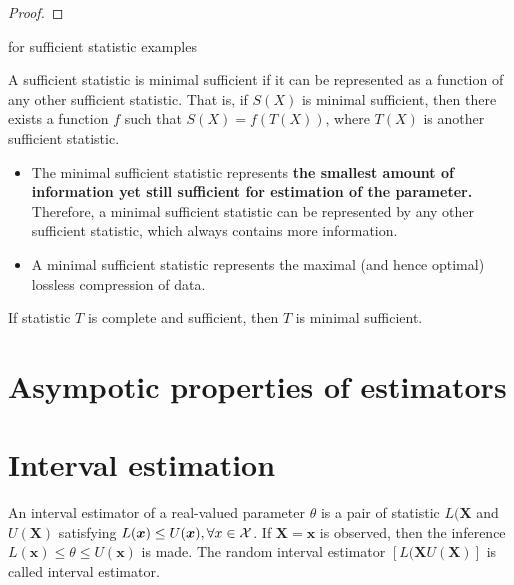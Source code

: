 \begin{refsection}
\begin{proof}
	
\end{proof}

\cite[451]{moon2000mathematical} for sufficient statistic examples







\begin{definition}\cite[48]{keener2010theoretical}
	A sufficient statistic is minimal sufficient if it can be represented as a function of any other sufficient statistic. That is, if $S(X)$ is minimal sufficient, then there exists a function $f$ such that $S(X) = f(T(X))$, where $T(X)$ is another sufficient statistic.
\end{definition}




\begin{remark}\hfill
	\begin{itemize}
		\item The minimal sufficient statistic represents \textbf{the smallest amount of information yet still sufficient for estimation of the parameter.} Therefore, a minimal sufficient statistic can be represented by any other sufficient statistic, which always contains more information.
		\item A minimal sufficient statistic represents the maximal (and hence optimal) lossless compression of data.
	\end{itemize}
\end{remark}

\begin{definition}\cite[48]{keener2010theoretical}
\end{definition}

\begin{theorem}\cite[49]{keener2010theoretical}
	If statistic $T$ is complete and sufficient, then $T$ is minimal sufficient. 
\end{theorem}


\section{Asympotic properties of estimators}


\section{Interval estimation}
\begin{definition}
	\cite[418]{casella2002statistical}
	An interval estimator of a real-valued parameter $\theta$ is a pair of statistic $L(\bm{X}$ and $U(\bm{X})$ satisfying $L(\bm{x}) \leq U(\bm{x}),\forall x\in \mathcal{X}$. If $\bm{X}=\bm{x}$ is observed, then the inference $L(\bm{x}) \leq\theta \leq U(\bm{x})$ is made. The random interval estimator $[L(\bm{X} U(\bm{X})]$ is called interval estimator.  
\end{definition}


\end{refsection}
